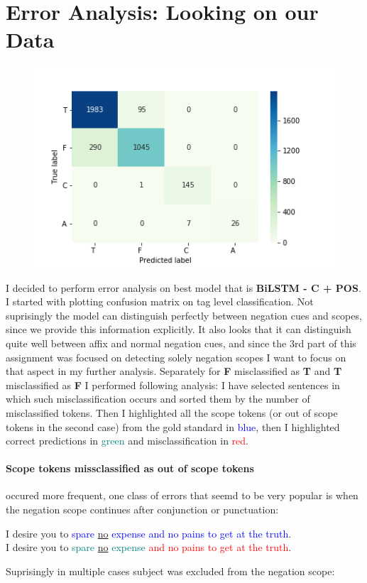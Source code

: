 \documentclass{article}
\begin{document}
\section{Error Analysis: Looking on our Data}
\begin{figure}
    \centering
    \includegraphics[scale=0.6]{../figures/confusion_matrix.png}
\end{figure}
I decided to perform error analysis on best model that is \textbf{BiLSTM - C + POS}. I started
with plotting confusion matrix on tag level classification. Not suprisingly the model can distinguish
perfectly between negation cues and scopes, since we provide this information explicitly. It also looks
that it can distinguish quite well between affix and normal negation cues, and since the 3rd part of
this assignment was focused on detecting solely negation scopes I want to focus on that aspect in my further
analysis. Separately for \textbf{F} misclassified as \textbf{T} and \textbf{T} misclassified as \textbf{F}
I performed following analysis: I have selected sentences in which such misclassification occurs and sorted
them by the number of misclassified tokens. Then I highlighted all the scope tokens (or out of scope tokens in the
second case) from the gold standard in \textcolor{blue}{blue}, then I highlighted correct predictions in \textcolor{teal}{green}
and misclassification in \textcolor{red}{red}.

\paragraph {Scope tokens missclassified as out of scope tokens} occured more frequent, one class of
errors that seemd to be very popular is when the negation scope continues after conjunction or punctuation:
\begin{displayquote}
I desire you to \textcolor{blue}{spare} \underline{no} \textcolor{blue}{expense and no pains to get at the truth}.\\
I desire you to \textcolor{teal}{spare} \underline{no} \textcolor{teal}{expense} \textcolor{red}{and no pains to get at the truth}.
\end{displayquote}
Suprisingly in multiple cases subject was excluded from the negation scope:
\end{document}
